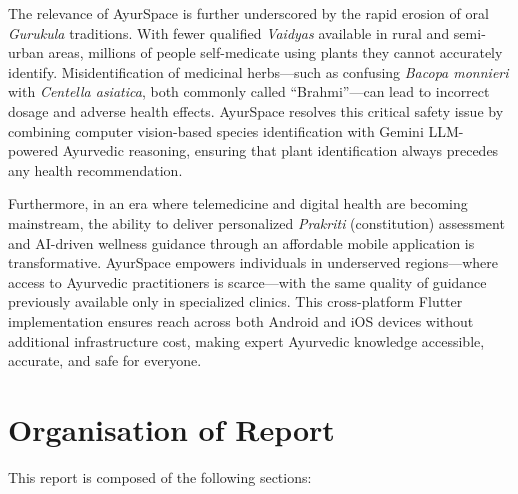The relevance of AyurSpace is further underscored by the rapid erosion of oral
\textit{Gurukula} traditions. With fewer qualified \textit{Vaidyas} available in rural
and semi-urban areas, millions of people self-medicate using plants they cannot accurately
identify. Misidentification of medicinal herbs---such as confusing \textit{Bacopa monnieri}
with \textit{Centella asiatica}, both commonly called ``Brahmi''---can lead to incorrect
dosage and adverse health effects. AyurSpace resolves this critical safety issue by
combining computer vision-based species identification with Gemini LLM-powered Ayurvedic
reasoning, ensuring that plant identification always precedes any health recommendation.

Furthermore, in an era where telemedicine and digital health are becoming mainstream,
the ability to deliver personalized \textit{Prakriti} (constitution) assessment and
AI-driven wellness guidance through an affordable mobile application is transformative.
AyurSpace empowers individuals in underserved regions---where access to Ayurvedic
practitioners is scarce---with the same quality of guidance previously available only
in specialized clinics. This cross-platform Flutter implementation ensures reach across
both Android and iOS devices without additional infrastructure cost, making expert
Ayurvedic knowledge accessible, accurate, and safe for everyone.

\newpage
\section{Organisation of Report}
\justify
This report is composed of the following sections:

